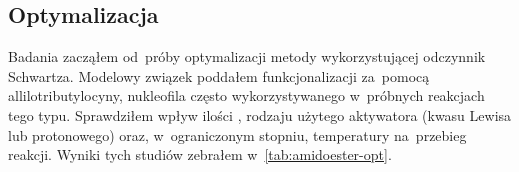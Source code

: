 \subsection{Optymalizacja}
Badania zacząłem od~próby optymalizacji metody wykorzystującej odczynnik Schwartza.
Modelowy związek  poddałem funkcjonalizacji za~pomocą
  allilotributylocyny, nukleofila często wykorzystywanego w~próbnych reakcjach tego typu.
Sprawdziłem wpływ ilości \schwartz{}, rodzaju użytego aktywatora (kwasu Lewisa lub protonowego) oraz,
  w~ograniczonym stopniu, temperatury na~przebieg reakcji.
Wyniki tych studiów zebrałem w~\cref{tab:amidoester-opt}.

\begin{table}
  {}  %

  \vspace{.2\baselineskip}  %
  

\end{table}
